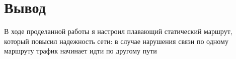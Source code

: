 \chapter{Вывод}
В ходе проделанной работы я настроил плавающий статический маршрут, который повысил надежность сети: в случае нарушения связи по одному маршруту трафик
начинает идти по другому пути
\endinput